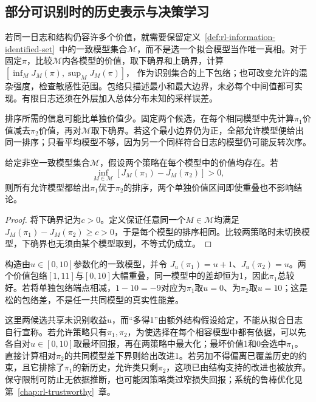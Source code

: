 \subsection{部分可识别时的历史表示与决策学习}
\label{sec:rl-information-partial-identification}

若同一日志和结构仍容许多个价值，就需要保留定义~\ref{def:rl-information-identified-set}~中的一致模型集合$\mathcal M$，而不是选一个拟合模型当作唯一真相。对于固定$\pi$，比较$\mathcal M$内各模型的价值，取下确界和上确界，计算
$[\inf_MJ_M(\pi),\sup_MJ_M(\pi)]$，
作为识别集合的上下包络；也可改变允许的混杂强度，检查敏感性范围。包络只描述最小和最大边界，未必每个中间值都可实现。有限日志还须在外层加入总体分布未知的采样误差。

排序所需的信息可能比单独价值少。固定两个候选，在每个相同模型中先计算$\pi_1$价值减去$\pi_2$价值，再对$\mathcal M$取下确界。若这个最小边界仍为正，全部允许模型便给出同一排序；只看平均模型不够，因为另一个同样符合日志的模型仍可能反转次序。

\begin{theorem}[共同模型下的性能差确定排序]
  \label{thm:rl-information-partial-order}
  给定非空一致模型集合$\mathcal M$，假设两个策略在每个模型中的价值均存在。若
  \[
    \inf_{M\in\mathcal M}
          [J_M(\pi_1)-J_M(\pi_2)]>0,
  \]
  则所有允许模型都给出$\pi_1$优于$\pi_2$的排序，两个单独价值区间即使重叠也不影响结论。
\end{theorem}

\begin{proof}
  将下确界记为$c>0$。定义保证任意同一个$M\in\mathcal M$均满足
  $J_M(\pi_1)-J_M(\pi_2)\geq c>0$，于是每个模型的排序相同。比较两策略时未切换模型，下确界也无须由某个模型取到，不等式仍成立。
\end{proof}

\begin{example}
  \label{ex:rl-information-partial-order}
  构造由$u\in[0,10]$参数化的一致模型，并令
  $J_u(\pi_1)=u+1$、$J_u(\pi_2)=u$。两个价值包络$[1,11]$与$[0,10]$大幅重叠，同一模型中的差却恒为1，因此$\pi_1$总较好。若将单独包络端点相减，$1-10=-9$对应为$\pi_1$取$u=0$、为$\pi_2$取$u=10$；这是松的包络差，不是任一共同模型的真实性能差。
\end{example}

这里两候选共享未识别收益$u$，而“多得1”由额外结构假设给定，不能从拟合日志自行宣称。若允许策略只有$\pi_1,\pi_2$，为使选择在每个相容模型中都有依据，可以先各自对$u\in[0,10]$取最坏回报，再在两策略中最大化；最坏价值1和0会选中$\pi_1$。直接计算相对$\pi_2$的共同模型差下界则给出改进1。若另加不得偏离已覆盖历史的约束，且它排除了$\pi_1$的新历史，允许类只剩$\pi_2$，这项已由结构支持的改进也被放弃。保守限制可防止无依据推断，也可能因策略类过窄损失回报；系统的鲁棒优化见第~\ref{chap:rl-trustworthy}~章。

